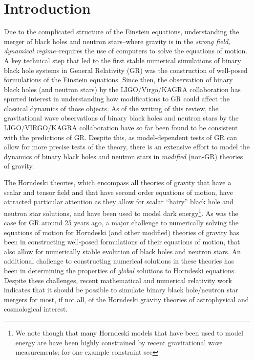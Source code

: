 \documentclass{ws-ijmpd}
\begin{document}
\section{Introduction	
   \label{sec:introduction}
}
Due to the complicated structure of the Einstein equations,
understanding the merger of black holes and neutron stars--where 
gravity is in the
\emph{strong field, dynamical regime}--requires the use of
computers to solve the equations of motion\cite{alcubierre2008introduction,
baumgarte2010numerical}. 
A key technical step that led to the first stable numerical
simulations of binary black hole systems in General Relativity (GR)
was the construction of well-posed formulations of the  Einstein 
equations\cite{Pretorius:2005gq,
Campanelli:2005dd,Baker:2005vv,Pretorius:2007nq}.
Since then, the observation of binary black holes (and neutron stars)
by the LIGO/Virgo/KAGRA
collaboration\cite{LIGOScientific:2016aoc,
LIGOScientific:2016sjg,LIGOScientific:2017vwq} 
has spurred interest in understanding how modifications to GR
could affect the classical dynamics of those objects\cite{Yunes:2013dva,
Berti:2015itd,Foucart:2022iwu}. 
As of the writing of this review,
the gravitational wave observations of binary black holes and neutron
stars by the LIGO/VIRGO/KAGRA collaboration have so far
been found to be consistent with the predictions of 
GR\cite{Yunes:2013dva,LIGOScientific:2016lio,LIGOScientific:2019fpa,
LIGOScientific:2020tif,Krishnendu:2021fga}.
Despite this,  
as model-dependent tests of GR can allow for more precise tests of the theory,
there is an extensive effort to model the dynamics of binary black holes
and neutron stars in \emph{modified} (non-GR) 
theories of gravity\cite{Berti:2015itd,Foucart:2022iwu}.

The Horndeski theories\cite{horndeski_paper,Deffayet:2009wt,Deffayet:2011gz},
which encompass all theories of gravity
that have a scalar and tensor field and that have second 
order equations of motion, have attracted particular attention
as they allow for scalar ``hairy'' black hole and neutron
star solutions\cite{Damour:1993hw,Kanti:1995vq,Sotiriou:2013qea},
and have been used to model dark energy\cite{Copeland:2006wr}\footnote{We note
though that many Horndeski models that have been used to model energy
are have been highly constrained by recent gravitational 
wave measurements; for one example constraint see
}.
As was the case for GR around 25 years ago, 
a major challenge to numerically solving the equations
of motion for Horndeski (and other modified) theories 
of gravity has been in constructing 
well-posed formulations of their equations of motion, that also
allow for numerically stable evolution of black holes 
and neutron stars\cite{Cayuso:2017iqc,
Allwright:2018rut,Bernard:2019fjb,Kovacs:2019jqj,
Witek:2020uzz,Kovacs:2020pns,Kovacs:2020ywu}.
An additional challenge to constructing numerical solutions
in these theories has been in determining the properties of 
\emph{global} solutions to Horndeski equations.
Despite these challenges, recent mathematical and numerical
relativity work indicates that it should be 
possible to simulate binary black hole/neutron star 
mergers for most, if not all, of the Horndeski gravity theories of
astrophysical and cosmological interest.
\end{document}
